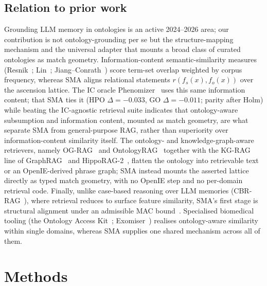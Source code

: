 \documentclass[pdflatex,sn-nature]{sn-jnl}
\begin{document}
\subsection{Relation to prior work}
 Grounding LLM memory in ontologies is an active
2024--2026 area; our contribution is not ontology-grounding per se but the
structure-mapping mechanism and the universal adapter that mounts a broad class of
curated ontologies as match geometry. Information-content semantic-similarity measures
(Resnik~\cite{resnik1995}; Lin~\cite{lin1998}; Jiang--Conrath~\cite{jiang1997})
score term-set overlap weighted by corpus frequency, whereas SMA aligns
relational statements $r(f_s(x),f_o(x))$ over the ascension lattice. The IC oracle
Phenomizer~\cite{kohler2009phenomizer} uses this same information content; that SMA
ties it (HPO $\Delta{=}{-}0.033$, GO $\Delta{=}{-}0.011$; parity after Holm) while
beating the IC-agnostic retrieval suite indicates that ontology-aware subsumption
and information content, mounted as match geometry, are what separate SMA from
general-purpose RAG, rather than superiority over information-content similarity
itself. The
ontology- and knowledge-graph-aware retrievers, namely OG-RAG~\cite{ograg2024} and
OntologyRAG~\cite{ontologyrag2025} together with the KG-RAG line of
GraphRAG~\cite{edge2024graphrag} and HippoRAG-2~\cite{gutierrez2025hipporag2},
flatten the ontology into retrievable text or an OpenIE-derived phrase graph;
SMA instead mounts the asserted lattice directly as typed match geometry, with no
OpenIE step and no per-domain retrieval code. Finally, unlike case-based
reasoning over LLM memories (CBR-RAG~\cite{cbrrag2024}), where retrieval reduces
to surface feature similarity, SMA's first stage is structural alignment under an
admissible MAC bound~\cite{forbus1995macfac}. Specialised biomedical tooling
(the Ontology Access Kit~\cite{oak}; Exomiser~\cite{exomiser}) realises
ontology-aware similarity within single domains, whereas SMA supplies one shared
mechanism across all of them.

\section{Methods}\label{sec:methods}
\end{document}
